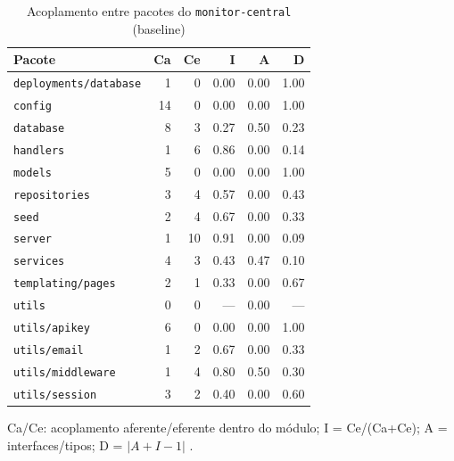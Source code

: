 \begin{table}[htbp]
  \centering\small
  \caption{Acoplamento entre pacotes do \texttt{monitor-central} (baseline)}
  \label{tab:baseline-acoplamento-central}
  \begin{tabular}{lrrrrr}
    \toprule
    Pacote & Ca & Ce & I & A & D \\
    \midrule
    \texttt{deployments/database} & 1 & 0 & 0.00 & 0.00 & 1.00 \\
    \texttt{config} & 14 & 0 & 0.00 & 0.00 & 1.00 \\
    \texttt{database} & 8 & 3 & 0.27 & 0.50 & 0.23 \\
    \texttt{handlers} & 1 & 6 & 0.86 & 0.00 & 0.14 \\
    \texttt{models} & 5 & 0 & 0.00 & 0.00 & 1.00 \\
    \texttt{repositories} & 3 & 4 & 0.57 & 0.00 & 0.43 \\
    \texttt{seed} & 2 & 4 & 0.67 & 0.00 & 0.33 \\
    \texttt{server} & 1 & 10 & 0.91 & 0.00 & 0.09 \\
    \texttt{services} & 4 & 3 & 0.43 & 0.47 & 0.10 \\
    \texttt{templating/pages} & 2 & 1 & 0.33 & 0.00 & 0.67 \\
    \texttt{utils} & 0 & 0 & --- & 0.00 & --- \\
    \texttt{utils/apikey} & 6 & 0 & 0.00 & 0.00 & 1.00 \\
    \texttt{utils/email} & 1 & 2 & 0.67 & 0.00 & 0.33 \\
    \texttt{utils/middleware} & 1 & 4 & 0.80 & 0.50 & 0.30 \\
    \texttt{utils/session} & 3 & 2 & 0.40 & 0.00 & 0.60 \\
    \bottomrule
  \end{tabular}
  \par\smallskip\footnotesize Ca/Ce: acoplamento aferente/eferente dentro do módulo; I = Ce/(Ca+Ce); A = interfaces/tipos; D = $|A+I-1|$ \cite{martin2002}.
\end{table}

